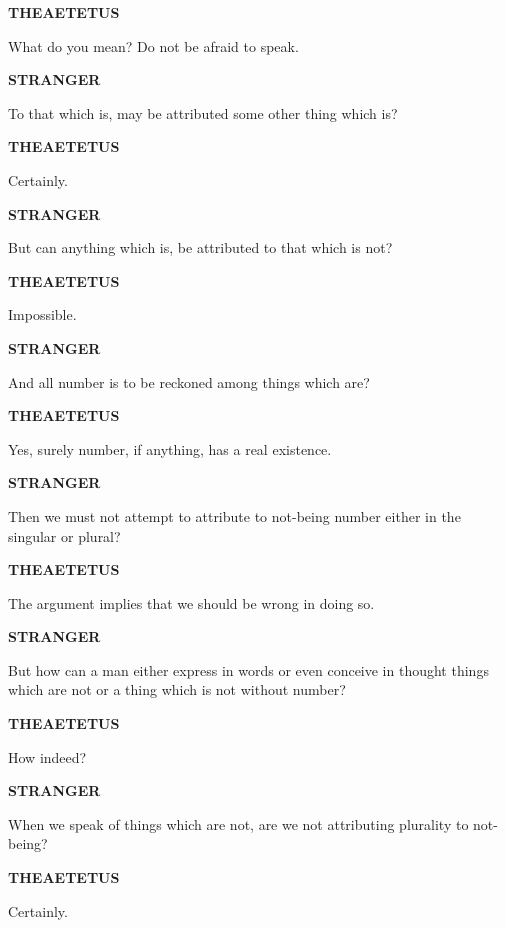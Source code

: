 \documentclass[11pt,letter]{article}
\begin{document}
\par \textbf{THEAETETUS}
\par   What do you mean? Do not be afraid to speak.

\par \textbf{STRANGER}
\par   To that which is, may be attributed some other thing which is?

\par \textbf{THEAETETUS}
\par   Certainly.

\par \textbf{STRANGER}
\par   But can anything which is, be attributed to that which is not?

\par \textbf{THEAETETUS}
\par   Impossible.

\par \textbf{STRANGER}
\par   And all number is to be reckoned among things which are?

\par \textbf{THEAETETUS}
\par   Yes, surely number, if anything, has a real existence.

\par \textbf{STRANGER}
\par   Then we must not attempt to attribute to not-being number either in the singular or plural?

\par \textbf{THEAETETUS}
\par   The argument implies that we should be wrong in doing so.

\par \textbf{STRANGER}
\par   But how can a man either express in words or even conceive in thought things which are not or a thing which is not without number?

\par \textbf{THEAETETUS}
\par   How indeed?

\par \textbf{STRANGER}
\par   When we speak of things which are not, are we not attributing plurality to not-being?

\par \textbf{THEAETETUS}
\par   Certainly.
\end{document}
